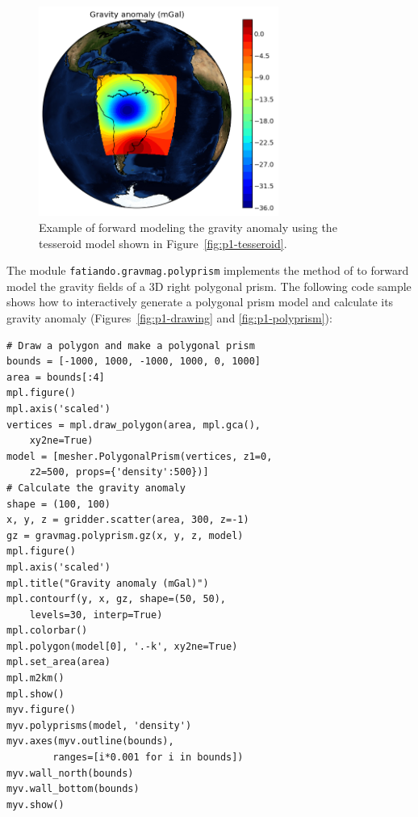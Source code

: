 \begin{figure}
    \centering
    \includegraphics[width=0.7\textwidth]{figures/paper-fatiando/gravmag_tesseroid_data}
    \caption{
        Example of forward modeling the gravity anomaly using the tesseroid
        model shown in Figure~\ref{fig:p1-tesseroid}.
    }
    \label{fig:p1-tesseroidgrav}
\end{figure}

The module \texttt{fatiando.gravmag.polyprism} implements the method of
\citet{plouff1976} to forward model the gravity fields of a 3D right polygonal
prism. The following code sample shows how to interactively generate a
polygonal prism model and calculate its gravity anomaly
(Figures~\ref{fig:p1-drawing} and \ref{fig:p1-polyprism}):

\begin{verbatim}
# Draw a polygon and make a polygonal prism
bounds = [-1000, 1000, -1000, 1000, 0, 1000]
area = bounds[:4]
mpl.figure()
mpl.axis('scaled')
vertices = mpl.draw_polygon(area, mpl.gca(),
    xy2ne=True)
model = [mesher.PolygonalPrism(vertices, z1=0,
    z2=500, props={'density':500})]
# Calculate the gravity anomaly
shape = (100, 100)
x, y, z = gridder.scatter(area, 300, z=-1)
gz = gravmag.polyprism.gz(x, y, z, model)
mpl.figure()
mpl.axis('scaled')
mpl.title("Gravity anomaly (mGal)")
mpl.contourf(y, x, gz, shape=(50, 50),
    levels=30, interp=True)
mpl.colorbar()
mpl.polygon(model[0], '.-k', xy2ne=True)
mpl.set_area(area)
mpl.m2km()
mpl.show()
myv.figure()
myv.polyprisms(model, 'density')
myv.axes(myv.outline(bounds),
        ranges=[i*0.001 for i in bounds])
myv.wall_north(bounds)
myv.wall_bottom(bounds)
myv.show()
\end{verbatim}


